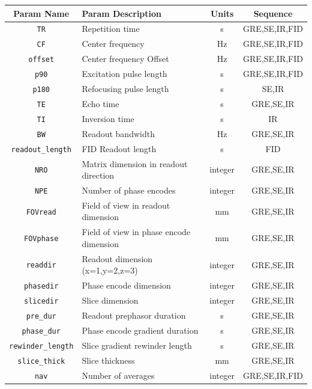 \documentclass[10pt,letterpaper]{article}
\begin{document}
\begin{table}
\begin{tabularx}{\textwidth}{|c|X|c|c|}
	\hline
	\textbf{Param Name} & \textbf{Param Description} & \textbf{Units} & \textbf{Sequence}  \\ \hline
	\texttt{TR} & Repetition time & s &GRE,SE,IR,FID\\ \hline
	\texttt{CF} & Center frequency & Hz &GRE,SE,IR,FID\\ \hline
	\texttt{offset} & Center frequency Offset & Hz & GRE,SE,IR,FID\\ \hline
	\texttt{p90} & Excitation pulse length & s & GRE,SE,IR,FID\\ \hline
	\texttt{p180} & Refocusing pulse length & s & SE,IR\\ \hline
	\texttt{TE} & Echo time & s & GRE,SE,IR\\ \hline
	\texttt{TI} & Inversion time & s & IR\\ \hline
	\texttt{BW} & Readout bandwidth & Hz & GRE,SE,IR\\ \hline
	\texttt{readout\_length} & FID Readout length & s & FID \\ \hline
	\texttt{NRO} & Matrix dimension in readout direction & integer & GRE,SE,IR\\ \hline
	\texttt{NPE} & Number of phase encodes & integer & GRE,SE,IR\\ \hline
	\texttt{FOVread} & Field of view in readout dimension & mm & GRE,SE,IR\\ \hline
	\texttt{FOVphase} & Field of view in phase encode dimension & mm & GRE,SE,IR\\ \hline
	\texttt{readdir} & Readout dimension (x=1,y=2,z=3) & integer & GRE,SE,IR\\ \hline
	\texttt{phasedir} & Phase encode dimension & integer & GRE,SE,IR\\ \hline
	\texttt{slicedir} & Slice dimension & integer & GRE,SE,IR\\ \hline
	\texttt{pre\_dur} & Readout prephasor duration & s & GRE,SE,IR\\ \hline
	\texttt{phase\_dur} & Phase encode gradient duration & s & GRE,SE,IR\\ \hline
	\texttt{rewinder\_length} & Slice gradient rewinder length & s & GRE,SE,IR\\ \hline
	\texttt{slice\_thick} & Slice thickness & mm & GRE,SE,IR\\ \hline
	\texttt{nav} & Number of averages & integer & GRE,SE,IR,FID\\ \hline

\end{tabularx}
\end{table}
\end{document}
